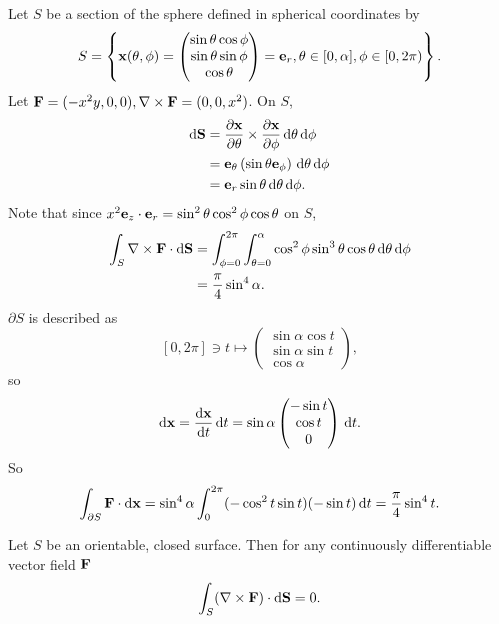 \begin{example}
    Let $S$ be a section of the sphere defined in spherical coordinates by
    \[
        S = \left\{ {\bf x}(\theta,\phi) = \begin{pmatrix}
            \sin \theta \cos \phi \\ \sin \theta \sin \phi \\ \cos \theta 
        \end{pmatrix}={\bf e}_r, \theta\in [0,\alpha],\phi\in [0,2\pi) \right\}.
    \]
    Let $ {\bf F} = (-x^2y,0,0), \nabla\times{\bf F} = (0,0,x^2) $. On $S$,
    \begin{align*}
        \mathrm{d} {\bf S} &= \frac{\partial {\bf x}}{\partial \theta} \times \frac{\partial {\bf x}}{\partial \phi}\,\mathrm{d} \theta\,\mathrm{d} \phi \\
        &= {\bf e}_\theta\left( \sin \theta {\bf e}_\phi \right) \,\mathrm{d} \theta\,\mathrm{d} \phi\\ 
        &= {\bf e}_r \sin \theta \,\mathrm{d} \theta\,\mathrm{d} \phi.
    \end{align*}
    Note that since $ x^2{\bf e}_z \cdot {\bf e}_r = \sin^2 \theta \cos^2 \phi \cos \theta $ on $S$, 
    \begin{align*}
        \int_{S} \nabla\times{\bf F} \cdot\mathrm{d}\mathbf{S} &= \int_{\phi=0}^{2\pi} \int_{\theta=0}^{\alpha} \cos^2 \phi \sin^3 \theta \cos \theta \,\mathrm{d}\theta \,\mathrm{d}\phi\\ 
        &= \frac{\pi}{4}\sin^4 \alpha.
    \end{align*}
    $ \partial S $ is described as
    \[
        [0,2\pi] \ni t \mapsto \begin{pmatrix}
            \sin \alpha \cos t \\ \sin \alpha \sin t \\ \cos \alpha
        \end{pmatrix},
    \]
    so 
    \[
        \mathrm{d} {\bf x} = \frac{\mathrm{d}{\bf x}}{\mathrm{d}t}\,\mathrm{d} t = \sin \alpha \begin{pmatrix}
            -\sin t \\ \cos t \\ 0
        \end{pmatrix}\,\mathrm{d} t. 
    \]
    So 
    \[
        \int_{\partial S} {\bf F} \cdot\mathrm{d}\mathbf{x} = \sin^4 \alpha \int_{0}^{2\pi} (-\cos^2 t \sin t)(-\sin t) \,\mathrm{d}t=\frac{\pi}{4}\sin^4 t.
    \]
\end{example}
\begin{example}
    Let $S$ be an orientable, closed surface. Then for any continuously differentiable vector field ${\bf F}$
    \[
        \int_{S} (\nabla\times {\bf F}) \cdot\mathrm{d}\mathbf{S}=0.
    \]
\end{example}
